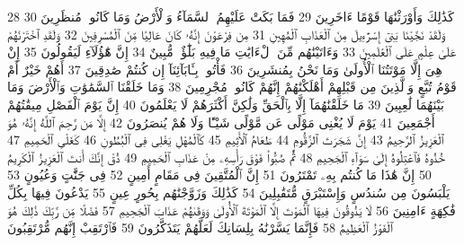 {\tiny\colorbox{cl_aya}{28}} كَذَٰلِكَ وَأَوْرَثْنَٰهَا قَوْمًا ءَاخَرِينَ
{\tiny\colorbox{cl_aya}{29}} فَمَا بَكَتْ عَلَيْهِمُ ٱلسَّمَآءُ وَٱلْأَرْضُ وَمَا كَانُوا۟ مُنظَرِينَ
{\tiny\colorbox{cl_aya}{30}} وَلَقَدْ نَجَّيْنَا بَنِىٓ إِسْرَٰٓءِيلَ مِنَ ٱلْعَذَابِ ٱلْمُهِينِ
{\tiny\colorbox{cl_aya}{31}} مِن فِرْعَوْنَ إِنَّهُۥ كَانَ عَالِيًا مِّنَ ٱلْمُسْرِفِينَ
{\tiny\colorbox{cl_aya}{32}} وَلَقَدِ ٱخْتَرْنَٰهُمْ عَلَىٰ عِلْمٍ عَلَى ٱلْعَٰلَمِينَ
{\tiny\colorbox{cl_aya}{33}} وَءَاتَيْنَٰهُم مِّنَ ٱلْءَايَٰتِ مَا فِيهِ بَلَٰٓؤٌا۟ مُّبِينٌ
{\tiny\colorbox{cl_aya}{34}} إِنَّ هَٰٓؤُلَآءِ لَيَقُولُونَ
{\tiny\colorbox{cl_aya}{35}} إِنْ هِىَ إِلَّا مَوْتَتُنَا ٱلْأُولَىٰ وَمَا نَحْنُ بِمُنشَرِينَ
{\tiny\colorbox{cl_aya}{36}} فَأْتُوا۟ بِـَٔابَآئِنَآ إِن كُنتُمْ صَٰدِقِينَ
{\tiny\colorbox{cl_aya}{37}} أَهُمْ خَيْرٌ أَمْ قَوْمُ تُبَّعٍ وَٱلَّذِينَ مِن قَبْلِهِمْ أَهْلَكْنَٰهُمْ إِنَّهُمْ كَانُوا۟ مُجْرِمِينَ
{\tiny\colorbox{cl_aya}{38}} وَمَا خَلَقْنَا ٱلسَّمَٰوَٰتِ وَٱلْأَرْضَ وَمَا بَيْنَهُمَا لَٰعِبِينَ
{\tiny\colorbox{cl_aya}{39}} مَا خَلَقْنَٰهُمَآ إِلَّا بِٱلْحَقِّ وَلَٰكِنَّ أَكْثَرَهُمْ لَا يَعْلَمُونَ
{\tiny\colorbox{cl_aya}{40}} إِنَّ يَوْمَ ٱلْفَصْلِ مِيقَٰتُهُمْ أَجْمَعِينَ
{\tiny\colorbox{cl_aya}{41}} يَوْمَ لَا يُغْنِى مَوْلًى عَن مَّوْلًى شَيْـًٔا وَلَا هُمْ يُنصَرُونَ
{\tiny\colorbox{cl_aya}{42}} إِلَّا مَن رَّحِمَ ٱللَّهُ إِنَّهُۥ هُوَ ٱلْعَزِيزُ ٱلرَّحِيمُ
{\tiny\colorbox{cl_aya}{43}} إِنَّ شَجَرَتَ ٱلزَّقُّومِ
{\tiny\colorbox{cl_aya}{44}} طَعَامُ ٱلْأَثِيمِ
{\tiny\colorbox{cl_aya}{45}} كَٱلْمُهْلِ يَغْلِى فِى ٱلْبُطُونِ
{\tiny\colorbox{cl_aya}{46}} كَغَلْىِ ٱلْحَمِيمِ
{\tiny\colorbox{cl_aya}{47}} خُذُوهُ فَٱعْتِلُوهُ إِلَىٰ سَوَآءِ ٱلْجَحِيمِ
{\tiny\colorbox{cl_aya}{48}} ثُمَّ صُبُّوا۟ فَوْقَ رَأْسِهِۦ مِنْ عَذَابِ ٱلْحَمِيمِ
{\tiny\colorbox{cl_aya}{49}} ذُقْ إِنَّكَ أَنتَ ٱلْعَزِيزُ ٱلْكَرِيمُ
{\tiny\colorbox{cl_aya}{50}} إِنَّ هَٰذَا مَا كُنتُم بِهِۦ تَمْتَرُونَ
{\tiny\colorbox{cl_aya}{51}} إِنَّ ٱلْمُتَّقِينَ فِى مَقَامٍ أَمِينٍ
{\tiny\colorbox{cl_aya}{52}} فِى جَنَّٰتٍ وَعُيُونٍ
{\tiny\colorbox{cl_aya}{53}} يَلْبَسُونَ مِن سُندُسٍ وَإِسْتَبْرَقٍ مُّتَقَٰبِلِينَ
{\tiny\colorbox{cl_aya}{54}} كَذَٰلِكَ وَزَوَّجْنَٰهُم بِحُورٍ عِينٍ
{\tiny\colorbox{cl_aya}{55}} يَدْعُونَ فِيهَا بِكُلِّ فَٰكِهَةٍ ءَامِنِينَ
{\tiny\colorbox{cl_aya}{56}} لَا يَذُوقُونَ فِيهَا ٱلْمَوْتَ إِلَّا ٱلْمَوْتَةَ ٱلْأُولَىٰ وَوَقَىٰهُمْ عَذَابَ ٱلْجَحِيمِ
{\tiny\colorbox{cl_aya}{57}} فَضْلًا مِّن رَّبِّكَ ذَٰلِكَ هُوَ ٱلْفَوْزُ ٱلْعَظِيمُ
{\tiny\colorbox{cl_aya}{58}} فَإِنَّمَا يَسَّرْنَٰهُ بِلِسَانِكَ لَعَلَّهُمْ يَتَذَكَّرُونَ
{\tiny\colorbox{cl_aya}{59}} فَٱرْتَقِبْ إِنَّهُم مُّرْتَقِبُونَ
